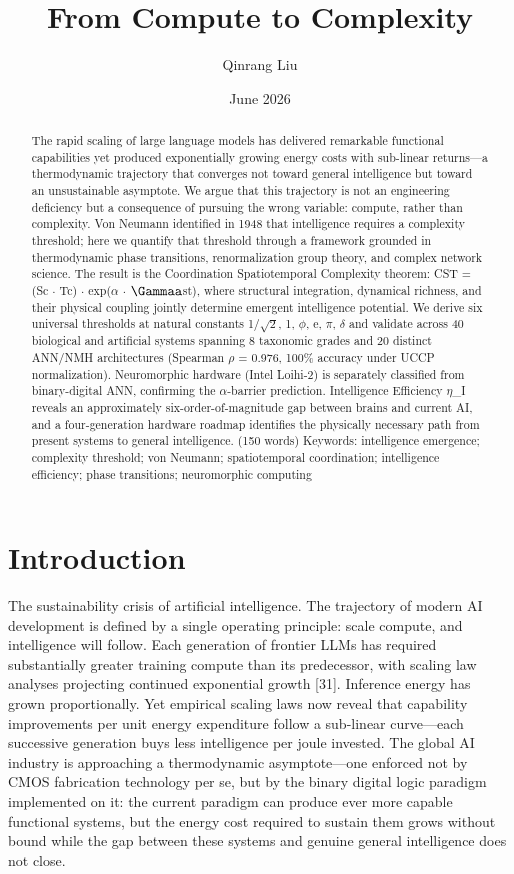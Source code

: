 \documentclass[a4paper,12pt]{article}
\title{From Compute to Complexity}
\author{Qinrang Liu}
\date{June 2026}
\begin{document}
\maketitle
\begin{abstract}
The rapid scaling of large language models has delivered remarkable functional capabilities yet produced exponentially growing energy costs with sub-linear returns---a thermodynamic trajectory that converges not toward general intelligence but toward an unsustainable asymptote. We argue that this trajectory is not an engineering deficiency but a consequence of pursuing the wrong variable: compute, rather than complexity. Von Neumann identified in 1948 that intelligence requires a complexity threshold; here we quantify that threshold through a framework grounded in thermodynamic phase transitions, renormalization group theory, and complex network science. The result is the Coordination Spatiotemporal Complexity theorem: CST = (Sc $\cdot$ Tc) $\cdot$ exp($\alpha$ $\cdot$ $\Gammaa$st), where structural integration, dynamical richness, and their physical coupling jointly determine emergent intelligence potential. We derive six universal thresholds at natural constants {1/$\sqrt{2}$, 1, $\phi$, e, $\pi$, $\delta$} and validate across 40 biological and artificial systems spanning 8 taxonomic grades and 20 distinct ANN/NMH architectures (Spearman $\rho$ = 0.976, 100\% accuracy under UCCP normalization). Neuromorphic hardware (Intel Loihi-2) is separately classified from binary-digital ANN, confirming the $\alpha$-barrier prediction. Intelligence Efficiency $\eta$\_I reveals an approximately six-order-of-magnitude gap between brains and current AI, and a four-generation hardware roadmap identifies the physically necessary path from present systems to general intelligence. (150 words) Keywords: intelligence emergence; complexity threshold; von Neumann; spatiotemporal coordination; intelligence efficiency; phase transitions; neuromorphic computing
\end{abstract}

\section{Introduction}

The sustainability crisis of artificial intelligence. The trajectory of modern AI development is defined by a single operating principle: scale compute, and intelligence will follow. Each generation of frontier LLMs has required substantially greater training compute than its predecessor, with scaling law analyses projecting continued exponential growth [31]. Inference energy has grown proportionally. Yet empirical scaling laws now reveal that capability improvements per unit energy expenditure follow a sub-linear curve---each successive generation buys less intelligence per joule invested. The global AI industry is approaching a thermodynamic asymptote---one enforced not by CMOS fabrication technology per se, but by the binary digital logic paradigm implemented on it: the current paradigm can produce ever more capable functional systems, but the energy cost required to sustain them grows without bound while the gap between these systems and genuine general intelligence does not close.
\end{document}
